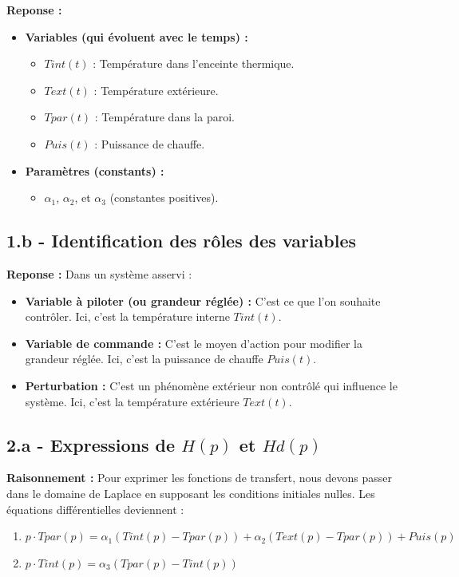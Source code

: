 \documentclass[11pt,a4paper]{article}
\begin{document}
\textbf{Reponse :}
\begin{itemize}
    \item \textbf{Variables (qui évoluent avec le temps) :}
    \begin{itemize}
        \item $Tint(t)$ : Température dans l'enceinte thermique.
        \item $Text(t)$ : Température extérieure.
        \item $Tpar(t)$ : Température dans la paroi.
        \item $Puis(t)$ : Puissance de chauffe.
    \end{itemize}
    \item \textbf{Paramètres (constants) :}
    \begin{itemize}
        \item $\alpha_1$, $\alpha_2$, et $\alpha_3$ (constantes positives).
    \end{itemize}
\end{itemize}

\subsection*{1.b - Identification des rôles des variables}

\textbf{Reponse :} Dans un système asservi :
\begin{itemize}
    \item \textbf{Variable à piloter (ou grandeur réglée) :} C'est ce que l'on souhaite contrôler. Ici, c'est la température interne $Tint(t)$.
    \item \textbf{Variable de commande :} C'est le moyen d'action pour modifier la grandeur réglée. Ici, c'est la puissance de chauffe $Puis(t)$.
    \item \textbf{Perturbation :} C'est un phénomène extérieur non contrôlé qui influence le système. Ici, c'est la température extérieure $Text(t)$.
\end{itemize}

\subsection*{2.a - Expressions de $H(p)$ et $Hd(p)$}

\textbf{Raisonnement :} Pour exprimer les fonctions de transfert, nous devons passer dans le domaine de Laplace en supposant les conditions initiales nulles. Les équations différentielles deviennent :
\begin{enumerate}
    \item $p \cdot Tpar(p) = \alpha_1(Tint(p) - Tpar(p)) + \alpha_2(Text(p) - Tpar(p)) + Puis(p)$
    \item $p \cdot Tint(p) = \alpha_3(Tpar(p) - Tint(p))$
\end{enumerate}
\end{document}
